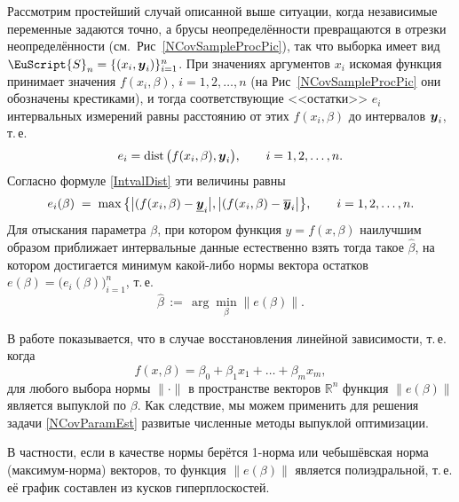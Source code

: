 \documentclass[a5paper,openany]{book}
\newcommand{\mbf}[1]{\protect\text{\boldmath$#1$}}
\newcommand{\mbb}{\mathbb}
\newcommand{\eus}{\EuScript}
\newcommand{\ov}{\overline}
\newcommand{\un}{\underline}
\newcommand{\dist}{\mathrm{dist}\,}
\begin{document}
Рассмотрим простейший случай описанной выше ситуации, когда независимые переменные 
задаются точно, а брусы неопределённости превращаются в отрезки неопределённости 
(см.~Рис~\ref{NCovSampleProcPic}), так что выборка имеет вид $\eus{S}_{n} = \{(x_{i}, 
\mbf{y}_{i})\}_{i=1}^n$. При значениях аргументов $x_i$ искомая функция принимает 
значения $f(x_{i}, \beta)$, $i = 1,2,\ldots,n$ (на Рис~\ref{NCovSampleProcPic} 
они обозначены крестиками), и тогда соответствующие <<остатки>> $e_i$ интервальных 
измерений равны расстоянию от этих $f(x_{i},\beta)$ до интервалов $\mbf{y}_i$, т.\,е. 
\begin{equation*} 
e_i = \dist\bigl(f(x_{i},\beta), \mbf{y}_{i}\bigr),  \qquad  i = 1,2,\ldots,n. 
\end{equation*} 
Согласно формуле \eqref{IntvalDist} эти величины равны 
\begin{equation*} 
e_{i}(\beta)\; = \;\max\,\bigl\{\bigl|(f(x_{i},\beta) - \un{\mbf{y}}_{i}\bigr|, 
   \bigl|(f(x_{i},\beta) - \ov{\mbf{y}}_{i}\bigr|\bigr\},  \qquad i = 1,2,\ldots,n. 
\end{equation*} 
Для отыскания параметра $\beta$, при котором функция $y = f(x,\beta)$ наилучшим образом 
приближает интервальные данные естественно взять тогда такое $\hat{\beta}$, на котором 
достигается минимум какой-либо нормы вектора остатков $e(\beta) = \bigl(e_{i}
(\beta)\bigr)_{i=1}^n$, т.\,е.  
\begin{equation} 
\label{NCovParamEst} 
\hat{\beta} \, := \,\arg\min_{\beta} \|e(\beta)\|. 
\end{equation} 

  
В работе \cite{ZvyaginSShary} показывается, что в случае восстановления линейной 
зависимости, т.\,е. когда 
\begin{equation*}
f(x,\beta) = \beta_{0} + \beta_{1}x_{1} + \ldots + \beta_{m}x_{m},      
\end{equation*}
для любого выбора нормы $\|\cdot\|$ в пространстве векторов $\mbb{R}^n$ функция 
$\|e(\beta)\|$ является выпуклой по $\beta$. Как следствие, мы можем применить 
для решения задачи \eqref{NCovParamEst} развитые численные методы выпуклой оптимизации. 
  
В частности, если в качестве нормы берётся 1-норма или чебышёвская норма 
(максимум-норма) векторов, то функция $\|e(\beta)\|$ является полиэдральной, 
т.\,е. её график составлен из кусков гиперплоскостей. 
  
\end{document}
